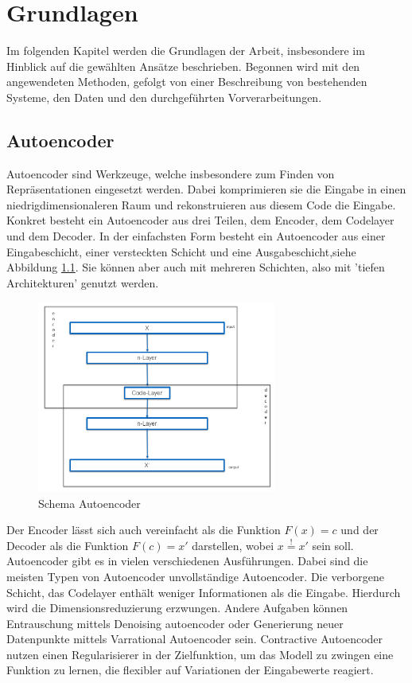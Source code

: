 \chapter{Grundlagen}
\label{chap:Grundlagen}
Im folgenden Kapitel werden die Grundlagen der Arbeit, insbesondere im Hinblick auf die gewählten Ansätze beschrieben. Begonnen wird mit den angewendeten Methoden, gefolgt von einer Beschreibung von bestehenden Systeme, den Daten und den durchgeführten Vorverarbeitungen.

	\section{Autoencoder}
	\label{sec:ConvolutionalAutoencoder}		
	Autoencoder \cite{D.E.Rumelhart.1987} sind Werkzeuge, welche insbesondere zum Finden von Repräsentationen eingesetzt werden. Dabei komprimieren sie die Eingabe in einen niedrigdimensionaleren Raum und rekonstruieren aus diesem Code die Eingabe. Konkret besteht ein Autoencoder aus drei Teilen, dem Encoder, dem Codelayer und dem Decoder. In der einfachsten Form besteht ein Autoencoder aus einer Eingabeschicht, einer versteckten Schicht und eine Ausgabeschicht,siehe Abbildung \ref{img:SchemaCAE}. Sie können aber auch mit mehreren Schichten, also mit 'tiefen Architekturen' genutzt werden. \cite{Hinton.2006}
	\begin{figure}[h]
		\centering
		\includegraphics[width=0.7\textwidth, center]{bilder/Schema_Autoencoders/Schema_CAE2.png}
		\caption[Schema Autoencoder]{Schema Autoencoder}
		\label{img:SchemaCAE}
	\end{figure} 

	Der Encoder lässt sich auch vereinfacht als die Funktion $F(x)=c$ und der Decoder als die Funktion $ F(c)=x'$ darstellen, wobei $x\stackrel{!}{=}x'$ sein soll. 
	Autoencoder gibt es in vielen verschiedenen Ausführungen. Dabei sind die meisten Typen von Autoencoder unvollständige Autoencoder. Die verborgene Schicht, das Codelayer enthält weniger Informationen als die Eingabe. Hierdurch wird die Dimensionsreduzierung erzwungen. Andere Aufgaben können Entrauschung mittels Denoising autoencoder \cite{Vincent.2008} oder Generierung neuer Datenpunkte mittels Varrational Autoencoder \cite{Kingma.2019} sein. Contractive Autoencoder \cite{Rifai.2011} nutzen einen Regularisierer in der Zielfunktion, um das Modell zu zwingen eine Funktion zu lernen, die flexibler auf Variationen der Eingabewerte reagiert.   	

